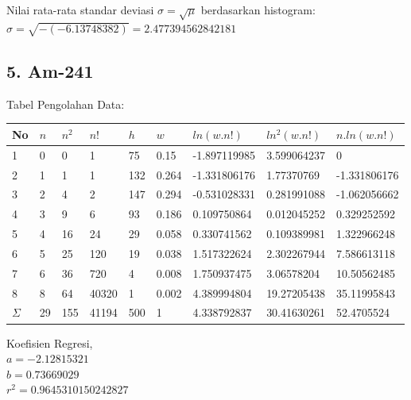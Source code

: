 \documentclass{article}
\begin{document}
			Nilai rata-rata standar deviasi $\sigma = \sqrt{\mu}$ berdasarkan histogram:\\
			$ \sigma = \sqrt{-(-6.13748382)} = 2.477394562842181 $\newpage
			
			\subsection*{5. Am-241}
			Tabel Pengolahan Data:
			\begin{longtable}{@{}lllllllll@{}}
				\toprule
				No  & $n$  & $n^{2}$ & $n!$   & $h$   & $w$     & $ln(w.n!)$     & $ln^{2}(w.n!)$ & $n.ln(w.n!)$   \\ \midrule
				\endfirsthead
				\endhead
				\bottomrule
				\endfoot
				\endlastfoot
				1   & 0  & 0                    & 1     & 75  & 0.15  & -1.897119985 & 3.599064237                 & 0            \\
				2   & 1  & 1                    & 1     & 132 & 0.264 & -1.331806176 & 1.77370769                  & -1.331806176 \\
				3   & 2  & 4                    & 2     & 147 & 0.294 & -0.531028331 & 0.281991088                 & -1.062056662 \\
				4   & 3  & 9                    & 6     & 93  & 0.186 & 0.109750864  & 0.012045252                 & 0.329252592  \\
				5   & 4  & 16                   & 24    & 29  & 0.058 & 0.330741562  & 0.109389981                 & 1.322966248  \\
				6   & 5  & 25                   & 120   & 19  & 0.038 & 1.517322624  & 2.302267944                 & 7.586613118  \\
				7   & 6  & 36                   & 720   & 4   & 0.008 & 1.750937475  & 3.06578204                  & 10.50562485  \\
				8   & 8  & 64                   & 40320 & 1   & 0.002 & 4.389994804  & 19.27205438                 & 35.11995843  \\* \midrule
				$\Sigma$ & 29 & 155                  & 41194 & 500 & 1     & 4.338792837  & 30.41630261                 & 52.4705524   \\* \bottomrule
			\end{longtable}
			\hspace{-0.6cm}Koefisien Regresi, \\
			$a = -2.12815321$ \\
			$b = 0.73669029$ \\
			$r^{2} = 0.9645310150242827$ \\
\end{document}
